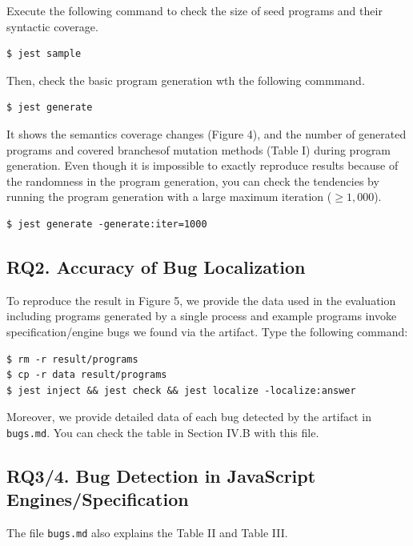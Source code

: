 \documentclass{article}
\begin{document}
Execute the following command to check the size of seed programs and their
syntactic coverage.
\begin{lstlisting}
$ jest sample
\end{lstlisting}
Then, check the basic program generation wth the following commmand.
\begin{lstlisting}
$ jest generate
\end{lstlisting}
It shows the semantics coverage changes (Figure 4), and the number of generated
programs and covered branchesof mutation methods (Table I) during program
generation.  Even though it is impossible to exactly reproduce results because
of the randomness in the program generation, you can check the tendencies by
running the program generation with a large maximum iteration ($\geq 1,000$).
\begin{lstlisting}
$ jest generate -generate:iter=1000
\end{lstlisting}

\subsection{RQ2. Accuracy of Bug Localization}

To reproduce the result in Figure 5, we provide the data used in the evaluation
including programs generated by a single process and example programs invoke
specification/engine bugs we found via the artifact.  Type the following
command:
\begin{lstlisting}
$ rm -r result/programs
$ cp -r data result/programs
$ jest inject && jest check && jest localize -localize:answer
\end{lstlisting}
Moreover, we provide detailed data of each bug detected by the artifact in
\texttt{bugs.md}. You can check the table in Section IV.B with this file.

\subsection{RQ3/4. Bug Detection in JavaScript Engines/Specification}

The file \texttt{bugs.md} also explains the Table II and Table III.
\end{document}
